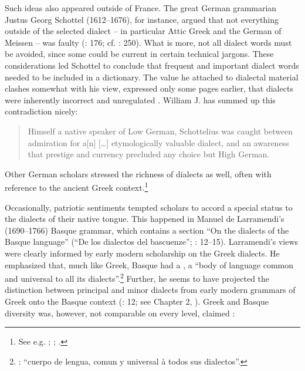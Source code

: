 Such ideas also appeared outside of France. The great German grammarian Justus Georg Schottel (1612–1676), for instance, argued that not everything outside of the selected dialect – in particular Attic Greek and the German of Meissen – was faulty (\citealt{Schottel1663}: 176; cf. \citealt{Roelcke2014}: 250). What is more, not all dialect words must be avoided, since some could be current in certain technical jargons. These considerations led Schottel to conclude that frequent and important dialect words needed to be included in a dictionary. The value he attached to dialectal material clashes somewhat with his view, expressed only some pages earlier, that dialects were inherently incorrect and unregulated \citep[174]{Schottel1663}. William J. \citet[1110]{Jones2001} has summed up this contradiction nicely:

\begin{quote}
Himself a native speaker of Low German, Schottelius was caught between admiration for a[n] […] etymologically valuable dialect, and an awareness that prestige and currency precluded any choice but High German.
\end{quote}

Other German scholars stressed the richness of  dialects as well, often with reference to the ancient Greek context.\footnote{See e.g. \citet[\textsc{a.3}\textsc{\textsuperscript{r}}\textsc{–a.3}\textsc{\textsuperscript{v}}]{Chytraeus1582}; \citet[\textsc{c.1}\textsc{\textsuperscript{r}}]{Meisner1705}; \citet[73]{Hertling1708}.}

Occasionally, patriotic sentiments tempted scholars to accord a special status to the dialects of their native  tongue. This happened in Manuel de Larramendi’s (1690–1766) Basque grammar, which contains a section “On the dialects of the Basque language” (“De los dialectos del bascuenze”; \citealt{Larramendi1729}: 12–15). Larramendi’s views were clearly informed by early modern scholarship on the Greek dialects. He emphasized that, much like Greek, Basque had a , a “body of language common and universal to all its dialects”.\footnote{\citet[12--13]{Larramendi1729}: “cuerpo de lengua, comun y universal à todos sus dialectos”.} Further, he seems to have projected the distinction between principal and minor dialects from early modern grammars of Greek onto the Basque context (\citealt{Larramendi1729}: 12; see Chapter 2, ). Greek and Basque diversity was, however, not comparable on every level, claimed \citet[12]{Larramendi1729}:

